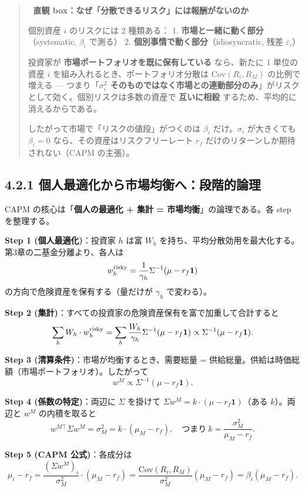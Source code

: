 \documentclass[11pt,a4paper]{report}
\begin{document}
\begin{quote}
🎯 \textbf{直観 box：なぜ「分散できるリスク」には報酬がないのか}

個別資産 $i$ のリスクには 2 種類ある：
1. \textbf{市場と一緒に動く部分}（systematic, $\beta_i$ で測る）
2. \textbf{個別事情で動く部分}（idiosyncratic, 残差 $\varepsilon_i$）

投資家が \textbf{市場ポートフォリオを既に保有している} なら、新たに 1 単位の資産 $i$ を組み入れるとき、ポートフォリオ分散は $\mathrm{Cov}(R_i, R_M)$ の比例で増える — つまり「\textbf{$\sigma_i^2$ そのものではなく市場との連動部分のみ}」がリスクとして効く。個別リスクは多数の資産で \textbf{互いに相殺} するため、平均的に消えるからである。

したがって市場で「リスクの値段」がつくのは $\beta_i$ だけ。$\sigma_i$ が大きくても $\beta_i = 0$ なら、その資産はリスクフリーレート $r_f$ だけのリターンしか期待されない（CAPM の主張）。
\end{quote}

\subsection{4.2.1 個人最適化から市場均衡へ：段階的論理}

CAPM の核心は「\textbf{個人の最適化 + 集計 = 市場均衡}」の論理である。各 step を整理する。

\textbf{Step 1 (個人最適化)}：投資家 $h$ は富 $W_h$ を持ち、平均分散効用を最大化する。第3章の二基金分離より、各人は \[ w_h^{\rm risky} = \frac{1}{\gamma_h} \Sigma^{-1}(\mu - r_f \mathbf{1}) \] の方向で危険資産を保有する（量だけが $\gamma_h$ で変わる）。

\textbf{Step 2 (集計)}：すべての投資家の危険資産保有を富で加重して合計すると \[ \sum_h W_h \cdot w_h^{\rm risky} = \sum_h \frac{W_h}{\gamma_h} \Sigma^{-1}(\mu - r_f \mathbf{1}) \propto \Sigma^{-1}(\mu - r_f \mathbf{1}). \]

\textbf{Step 3 (清算条件)}：市場が均衡するとき、需要総量 = 供給総量。供給は時価総額（市場ポートフォリオ）。したがって \[ w^M \propto \Sigma^{-1}(\mu - r_f \mathbf{1}). \]

\textbf{Step 4 (係数の特定)}：両辺に $\Sigma$ を掛けて $\Sigma w^M = k \cdot (\mu - r_f \mathbf{1})$（ある $k$）。両辺と $w^M$ の内積を取ると \[ w^{M\top} \Sigma w^M = \sigma_M^2 = k \cdot (\mu_M - r_f), \quad \text{つまり}\ k = \frac{\sigma_M^2}{\mu_M - r_f}. \]

\textbf{Step 5 (CAPM 公式)}：各成分は \[ \mu_i - r_f = \frac{(\Sigma w^M)_i}{\sigma_M^2} \cdot (\mu_M - r_f) = \frac{\mathrm{Cov}(R_i, R_M)}{\sigma_M^2}(\mu_M - r_f) = \beta_i (\mu_M - r_f). \]
\end{document}
